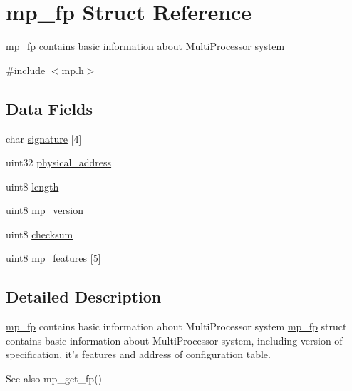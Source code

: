 \hypertarget{structmp__fp}{
\section{mp\_\-fp Struct Reference}
\label{structmp__fp}
}


\hyperlink{structmp__fp}{mp\_\-fp} contains basic information about MultiProcessor system  




{\ttfamily \#include $<$mp.h$>$}

\subsection*{Data Fields}
\begin{DoxyCompactItemize}
\item 
char \hyperlink{structmp__fp_ae6aa326faac247e8cfca9e23b575d7e0}{signature} \mbox{[}4\mbox{]}
\item 
uint32 \hyperlink{structmp__fp_ab714f4a6339f0a7bb19fec19c4e06877}{physical\_\-address}
\item 
uint8 \hyperlink{structmp__fp_a027a047614a3f10f65b691e4d118f751}{length}
\item 
uint8 \hyperlink{structmp__fp_a237961558ddc5aa91d18d84cd9a109fa}{mp\_\-version}
\item 
uint8 \hyperlink{structmp__fp_aa1aaa861e57ff7021fd7f2a446e986ec}{checksum}
\item 
uint8 \hyperlink{structmp__fp_aff7cb275110c037679f1ce06971fc3e9}{mp\_\-features} \mbox{[}5\mbox{]}
\end{DoxyCompactItemize}


\subsection{Detailed Description}
\hyperlink{structmp__fp}{mp\_\-fp} contains basic information about MultiProcessor system \hyperlink{structmp__fp}{mp\_\-fp} struct contains basic information about MultiProcessor system, including version of specification, it's features and address of configuration table.

\begin{DoxySeeAlso}{See also}
mp\_\-get\_\-fp() 
\end{DoxySeeAlso}


